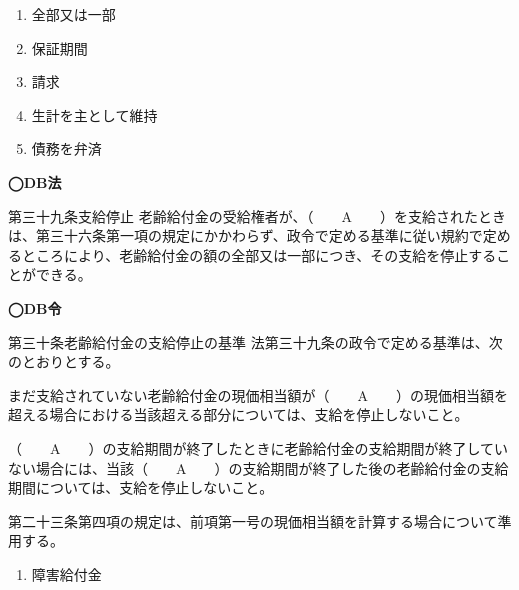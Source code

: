 \begin{answerbox}
  \begin{enumerate}[A:]
    \item 全部又は一部
    \item 保証期間
    \item 請求
    \item 生計を主として維持
    \item 債務を弁済
  \end{enumerate}
\end{answerbox}

\begin{fillblank}[自作 2026/10/12]
  \noindent \textbf{◯DB法}
  \begin{lawstructure}
    \begin{lawarticle}{第三十九条}{支給停止}
      老齢給付金の受給権者が、（　　A　　）を支給されたときは、第三十六条第一項の規定にかかわらず、政令で定める基準に従い規約で定めるところにより、老齢給付金の額の全部又は一部につき、その支給を停止することができる。
    \end{lawarticle}
  \end{lawstructure}

  \noindent \textbf{◯DB令}
  \begin{lawstructure}
    \begin{lawarticle}{第三十条}{老齢給付金の支給停止の基準}
      法第三十九条の政令で定める基準は、次のとおりとする。

      まだ支給されていない老齢給付金の現価相当額が（　　A　　）の現価相当額を超える場合における当該超える部分については、支給を停止しないこと。
      
（　　A　　）の支給期間が終了したときに老齢給付金の支給期間が終了していない場合には、当該（　　A　　）の支給期間が終了した後の老齢給付金の支給期間については、支給を停止しないこと。

  第二十三条第四項の規定は、前項第一号の現価相当額を計算する場合について準用する。


    \end{lawarticle}
  \end{lawstructure}
\end{fillblank}

\begin{answerbox}
  \begin{enumerate}[A:]
    \item 障害給付金
  \end{enumerate}
\end{answerbox}

